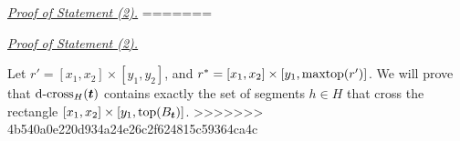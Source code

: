 \noindent \underline{\em Proof of Statement (2).} 
=======
\vgap
 
\noindent \underline{\em Proof of Statement (2).} 


Let $r' = [x_1,x_2]\times [y_1,y_2]$, and $r^* = [x_1,x_2] \times [y_1,\mathrm{maxtop}(r')]$. We will prove that $\mathrm{d\text{-}cross}_H(\textrm{\boldmath${t}$})$ contains exactly the set of segments $h\in H$ that cross the rectangle $[x_1,x_2]\times [y_1,\mathrm{top}(B_{\textrm{\boldmath${t}$}})]$.
>>>>>>> 4b540a0e220d934a24e26c2f624815c59364ca4c
